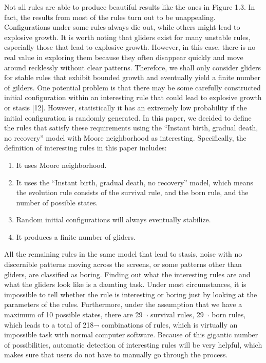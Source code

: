 \documentclass[12pt]{article}
\numberwithin{figure}{section} %
\begin{document}
Not all rules are able to produce beautiful results like the ones in Figure 1.3. In fact, the results from most of the rules turn out to be unappealing. Configurations under some rules always die out, while others might lead to explosive growth. It is worth noting that gliders exist for many unstable rules, especially those that lead to explosive growth. However, in this case, there is no real value in exploring them because they often disappear quickly and move around recklessly without clear patterns. Therefore, we shall only consider gliders for stable rules that exhibit bounded growth and eventually yield a finite number of gilders. One potential problem is that there may be some carefully constructed initial configuration within an interesting rule that could lead to explosive growth or stasis [12]. However, statistically it has an extremely low probability if the initial configuration is randomly generated. In this paper, we decided to define the rules that satisfy these requirements using the “Instant birth, gradual death, no recovery” model with Moore neighborhood as interesting. Specifically, the definition of interesting rules in this paper includes: 
\begin{enumerate}[topsep=0pt,itemsep=-1ex,partopsep=1ex,parsep=1ex]
\item It uses Moore neighborhood. 
\item It uses the “Instant birth, gradual death, no recovery” model, which means the evolution rule consists of the survival rule, and the born rule, and the number of possible states. 
\item Random initial configurations will always eventually stabilize. 
\item It produces a finite number of gliders. 
\end{enumerate}

All the remaining rules in the same model that lead to stasis, noise with no discernible patterns moving across the screens, or some patterns other than gliders, are classified as boring. Finding out what the interesting rules are and what the gliders look like is a daunting task. Under most circumstances, it is impossible to tell whether the rule is interesting or boring just by looking at the parameters of the rules. Furthermore, under the assumption that we have a maximum of 10 possible states, there are 29¬ survival rules, 29¬ born rules, which leads to a total of 218¬ combinations of rules, which is virtually an impossible task with normal computer software. Because of this gigantic number of possibilities, automatic detection of interesting rules will be very helpful, which makes sure that users do not have to manually go through the process. 
\end{document}

